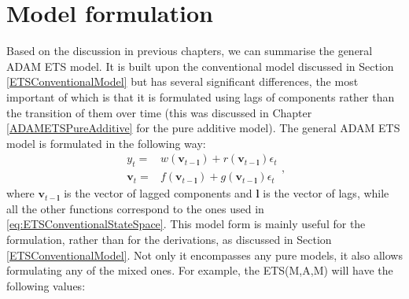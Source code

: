 \documentclass[
]{book}
\theoremstyle{definition}
\theoremstyle{definition}
\theoremstyle{definition}
\theoremstyle{definition}
\theoremstyle{remark}
\begin{document}
\hypertarget{ADAMETSGeneral}{%
\section{Model formulation}\label{ADAMETSGeneral}}

Based on the discussion in previous chapters, we can summarise the general ADAM ETS model. It is built upon the conventional model discussed in Section \ref{ETSConventionalModel} but has several significant differences, the most important of which is that it is formulated using lags of components rather than the transition of them over time (this was discussed in Chapter \ref{ADAMETSPureAdditive} for the pure additive model). The general ADAM ETS model is formulated in the following way:
\begin{equation}
  \begin{aligned}
    {y}_{t} = &w(\mathbf{v}_{t-\mathbf{l}}) + r(\mathbf{v}_{t-\mathbf{l}}) \epsilon_t \\
    \mathbf{v}_{t} = &f(\mathbf{v}_{t-\mathbf{l}}) + g(\mathbf{v}_{t-\mathbf{l}}) \epsilon_t
  \end{aligned},
  \label{eq:ETSADAMStateSpace}
\end{equation}
where \(\mathbf{v}_{t-\mathbf{l}}\) is the vector of lagged components and \(\mathbf{l}\) is the vector of lags, while all the other functions correspond to the ones used in \eqref{eq:ETSConventionalStateSpace}. This model form is mainly useful for the formulation, rather than for the derivations, as discussed in Section \ref{ETSConventionalModel}. Not only it encompasses any pure models, it also allows formulating any of the mixed ones. For example, the ETS(M,A,M) will have the following values:
\end{document}
